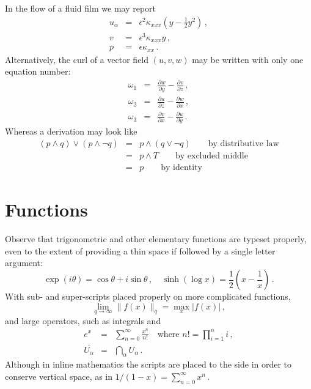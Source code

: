 \documentclass[12pt,a4paper]{article}
\begin{document}
In the flow of a fluid film we may report
\begin{eqnarray}
	u_\alpha & = & \epsilon^2 \kappa_{xxx} 
	\left( y-\frac{1}{2}y^2 \right)\,,
	\label{equ}  \\
	v & = & \epsilon^3 \kappa_{xxx} y\,,
	\label{eqv}  \\
	p & = & \epsilon \kappa_{xx}\,.
	\label{eqp}
\end{eqnarray}
Alternatively, the curl of a vector field $(u,v,w)$ may be written 
with only one equation number:
\begin{eqnarray}
	\omega_1 & = &
	\frac{\partial w}{\partial y}-\frac{\partial v}{\partial z}\,,
	\nonumber  \\
	\omega_2 & = & 
	\frac{\partial u}{\partial z}-\frac{\partial w}{\partial x}\,,
	\label{eqcurl}  \\
	\omega_3 & = & 
	\frac{\partial v}{\partial x}-\frac{\partial u}{\partial y}\,.
	\nonumber
\end{eqnarray}
Whereas a derivation may look like
\begin{eqnarray*}
	(p\wedge q)\vee(p\wedge\neg q) & = & p\wedge(q\vee\neg q)
	\qquad\mbox{by distributive law}  \\
	 & = & p\wedge T \qquad\mbox{by excluded middle}  \\
	 & = & p \qquad\mbox{by identity}
\end{eqnarray*}






\section{Functions}

Observe that trigonometric and other elementary functions are typeset 
properly, even to the extent of providing a thin space if followed by 
a single letter argument:
\begin{displaymath}
	\exp(i\theta)=\cos\theta +i\sin\theta\,,\quad
	\sinh(\log x)=\frac{1}{2}\left( x-\frac{1}{x} \right)\,.
\end{displaymath}
With sub- and super-scripts placed properly on more complicated 
functions,
\begin{displaymath}
	\lim_{q\to\infty}\|f(x)\|_q 
	=\max_{x}|f(x)|\,,
\end{displaymath}
and large operators, such as integrals and
\begin{eqnarray*}
	e^x & = & \sum_{n=0}^\infty \frac{x^n}{n!}
	\quad\mbox{where }n!=\prod_{i=1}^n i\,,  \\
	\overline{U_\alpha} & = & \bigcap_\alpha U_\alpha\,.
\end{eqnarray*}
Although in inline mathematics the scripts are placed to the side in 
order to conserve vertical space, as in
\begin{math}
	1/(1-x)=\sum_{n=0}^\infty x^n\,.
\end{math}
\end{document}
